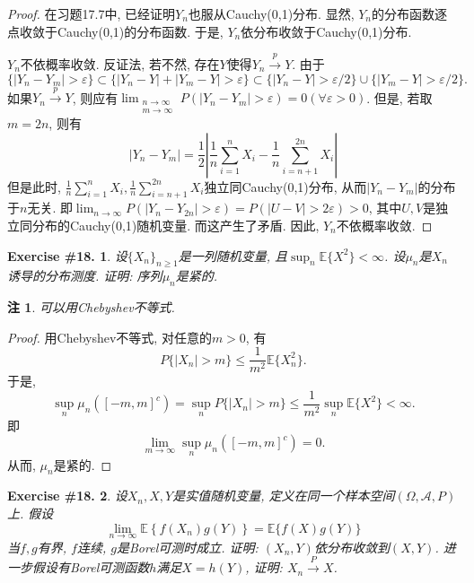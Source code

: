 \documentclass[UTF8, a4paper]{article}
\newtheorem{exercise}{Exercise \#18.}
\newtheorem*{remark}{注}
\begin{document}
\begin{proof}
在习题17.7中, 已经证明\(Y_n\)也服从Cauchy(0,1)分布. 
显然, \(Y_n\)的分布函数逐点收敛于Cauchy(0,1)的分布函数. 于是, \(Y_n\)依分布收敛于Cauchy(0,1)分布.

\(Y_n\)不依概率收敛. 反证法, 若不然, 存在\(Y\)使得\(Y_n \xrightarrow{p} Y\). 
由于
$$
\{|Y_n -Y_m| > \varepsilon\} \subset \{|Y_n - Y| + |Y_m - Y| > \varepsilon\} \subset \{|Y_n - Y| > \varepsilon/2\} \cup \{|Y_m - Y| > \varepsilon/2\}.
$$
如果\(Y_n \xrightarrow{p} Y\), 则应有\(\lim_{\substack{n \to \infty \\ m \to \infty}} P(|Y_n - Y_m| > \varepsilon) = 0(\forall \varepsilon > 0)\).
但是, 若取\(m=2n\), 则有
$$
\left|Y_n-Y_m\right|=\frac{1}{2}\left|\frac{1}{n} \sum_{i=1}^n X_i-\frac{1}{n} \sum_{i=n+1}^{2 n} X_i\right|
$$
但是此时, \(\frac{1}{n} \sum_{i=1}^n X_i, \frac{1}{n} \sum_{i=n+1}^{2 n} X_i\)独立同Cauchy(0,1)分布, 从而\(\left|Y_n-Y_m\right|\)的分布于\(n\)无关.
即\(\lim_{n\to \infty} P(|Y_{n} - Y_{2n}| > \varepsilon) = P(|U-V| > 2\varepsilon) > 0\), 其中\(U,V\)是独立同分布的Cauchy(0,1)随机变量.
而这产生了矛盾. 
因此, \(Y_n\)不依概率收敛. 
\end{proof}


\begin{framed}
\begin{exercise}
设\(\{X_n\}_{n\geq 1}\)是一列随机变量, 且\(\sup_{n} \mathbb{E}\{X^2\} < \infty\).
设\(\mu_n\)是\(X_n\)诱导的分布测度. 证明: 序列\(\mu_n\)是紧的.
\end{exercise}
\end{framed}

\begin{remark}
可以用Chebyshev不等式.
\end{remark}

\begin{proof}
用Chebyshev不等式, 对任意的\(m > 0\), 有
$$
P\{|X_n| > m\} \leq \frac{1}{m^2}\mathbb{E}\{X_n^2\} .
$$
于是, 
$$
\sup_{n}\mu_n([-m, m]^c) = \sup_{n}P\{|X_n| > m\}\leq \frac{1}{m^2}\sup_{n}\mathbb{E}\{X^2\} < \infty.
$$
即 
$$
\lim_{m\to\infty}\sup_{n}\mu_n([-m, m]^c) =0.
$$
从而, \(\mu_n\)是紧的.
\end{proof}


\begin{framed}
\begin{exercise}
设\(X_n, X, Y\)是实值随机变量, 定义在同一个样本空间\((\Omega, \mathcal{A}, P)\)上.
假设
$$
\lim _{n \rightarrow \infty} \mathbb{E}\left\{f\left(X_n\right) g(Y)\right\}=\mathbb{E}\{f(X) g(Y)\}
$$
当\(f,g\)有界, \(f\)连续, \(g\)是Borel可测时成立.
证明: \((X_n, Y)\)依分布收敛到\((X, Y)\).
进一步假设有Borel可测函数\(h\)满足\(X = h(Y)\), 证明: \(X_n \xrightarrow{P} X\).
\end{exercise}
\end{framed}
\end{document}
